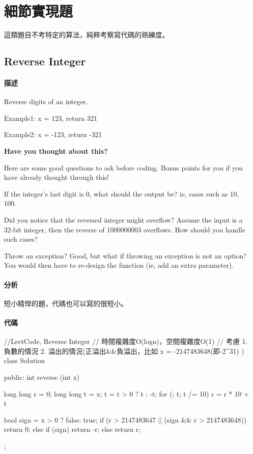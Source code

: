 \chapter{細節實現題}
這類題目不考特定的算法，純粹考察寫代碼的熟練度。
\newline


\section{Reverse Integer} %
\label{sec:reverse-integer}


\subsubsection{描述}
Reverse digits of an integer.

Example1: x = 123, return 321

Example2: x = -123, return -321


\textbf{Have you thought about this?}

Here are some good questions to ask before coding. Bonus points for you if you have already thought through this!

If the integer's last digit is 0, what should the output be? ie, cases such as 10, 100.

Did you notice that the reversed integer might overflow? Assume the input is a 32-bit integer, then the reverse of 1000000003 overflows. How should you handle such cases?

Throw an exception? Good, but what if throwing an exception is not an option? You would then have to re-design the function (ie, add an extra parameter).


\subsubsection{分析}
短小精悍的題，代碼也可以寫的很短小。


\subsubsection{代碼}
\begin{Code}
//LeetCode, Reverse Integer
// 時間複雜度O(logn)，空間複雜度O(1)
// 考慮 1.負數的情況 2. 溢出的情況(正溢出&&負溢出，比如 x = -2147483648(即-2^31) )
class Solution {
public:
    int reverse (int x) {
        long long r = 0;
        long long t = x;
        t = t > 0 ? t : -t;
        for (; t; t /= 10)
            r = r * 10 + t %

        bool sign = x > 0 ? false: true;
        if (r > 2147483647 || (sign && r > 2147483648)) {
            return 0;
        } else {
            if (sign) {
                return -r;
            } else {
                return r;
            }
        }
    }
};
\end{Code}



